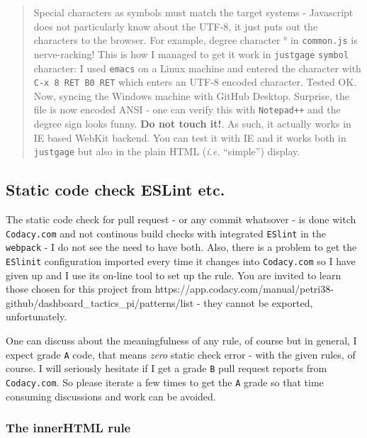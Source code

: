\documentclass[11pt]{article}
\begin{document}
    \begin{quote}
Special characters as symbols must match the target systems - Javascript
does not particularly know about the UTF-8, it just puts out the
characters to the browser. For example, degree character ° in
\texttt{common.js} is nerve-racking! This is how I managed to get it
work in \texttt{justgage} \texttt{symbol} character: I used
\texttt{emacs} on a Linux machine and entered the character with
\texttt{C-x\ 8\ RET\ B0\ RET} which enters an UTF-8 encoded character.
Tested OK. Now, syncing the Windows machine with GitHub Desktop.
Surprise, the file is now encoded ANSI - one can verify this with
\texttt{Notepad++} and the degree sign looks funny. \textbf{Do not touch
it!}. As such, it actually works in IE based WebKit backend. You can
test it with IE and it works both in \texttt{justgage} but also in the
plain HTML (\emph{i.e.} ``simple'') display.
\end{quote}

    \hypertarget{static-code-check-eslint-etc.}{%
\subsection{Static code check ESLint
etc.}\label{static-code-check-eslint-etc.}}

    The static code check for pull request - or any commit whatsover - is
done witch \texttt{Codacy.com} and not continous build checks with
integrated \texttt{ESlint} in the \texttt{webpack} - I do not see the
need to have both. Also, there is a problem to get the \texttt{ESlinit}
configuration imported every time it changes into \texttt{Codacy.com} so
I have given up and I use its on-line tool to set up the rule. You are
invited to learn those chosen for this project from
https://app.codacy.com/manual/petri38-github/dashboard\_tactics\_pi/patterns/list
- they cannot be exported, unfortunately.

    One can discuss about the meaningfulness of any rule, of course but in
general, I expect grade \texttt{A} code, that means \emph{zero} static
check error - with the given rules, of course. I will seriously hesitate
if I get a grade \texttt{B} pull request reports from
\texttt{Codacy.com}. So please iterate a few times to get the \texttt{A}
grade so that time consuming discussions and work can be avoided.

    \hypertarget{the-innerhtml-rule}{%
\subsubsection{The innerHTML rule}\label{the-innerhtml-rule}}
\end{document}
